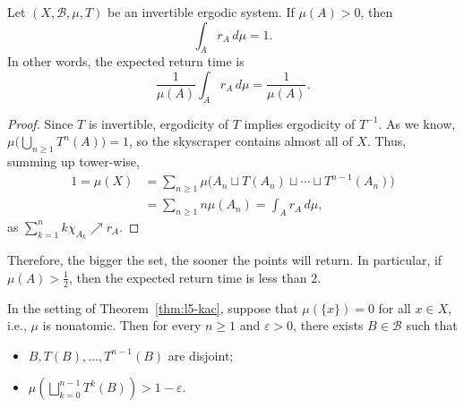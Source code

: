 \documentclass[11pt,a4paper]{article}
\begin{document}
\setcounter{theorem}{16}\begin{theorem}\label{thm:l5-kac}
Let $(X,\mathcal B,\mu,T)$ be an invertible ergodic system. If $\mu(A)>0$, then
\[
 \int_A r_A\,d\mu=1.
\]
In other words, the expected return time is
\[
 \frac1{\mu(A)}\int_A r_A\,d\mu=\frac1{\mu(A)}.
\]
\end{theorem}
\begin{proof}
Since $T$ is invertible, ergodicity of $T$ implies ergodicity of $T^{-1}$. As
we know, $\mu\bigl(\bigcup_{n\geq1}T^n(A)\bigr)=1$, so the skyscraper contains
almost all of $X$. Thus, summing up tower-wise,
\[
\begin{aligned}
 1=\mu(X)
 &=\sum_{n\geq1}\mu\bigl(A_n\sqcup T(A_n)\sqcup\cdots\sqcup T^{n-1}(A_n)\bigr)\\
 &=\sum_{n\geq1}n\mu(A_n)=\int_A r_A\,d\mu,
\end{aligned}
\]
as $\sum_{k=1}^n k\chi_{A_k}\nearrow r_A$.
\end{proof}
Therefore, the bigger the set, the sooner the points will return. In
particular, if $\mu(A)>\frac12$, then the expected return time is less than
$2$.

\setcounter{theorem}{17}\begin{theorem}\label{thm:l5-rokhlin}
In the setting of Theorem~\ref{thm:l5-kac}, suppose that $\mu(\{x\})=0$ for all $x\in X$, i.e., $\mu$ is nonatomic. Then for every $n\geq1$ and $\varepsilon>0$, there exists $B\in\mathcal B$ such that
\begin{itemize}
 \item $B,T(B),\ldots,T^{n-1}(B)$ are disjoint;
 \item $\displaystyle\mu\left(\bigsqcup_{k=0}^{n-1}T^k(B)\right)>1-\varepsilon$.
\end{itemize}
\end{theorem}
\end{document}
